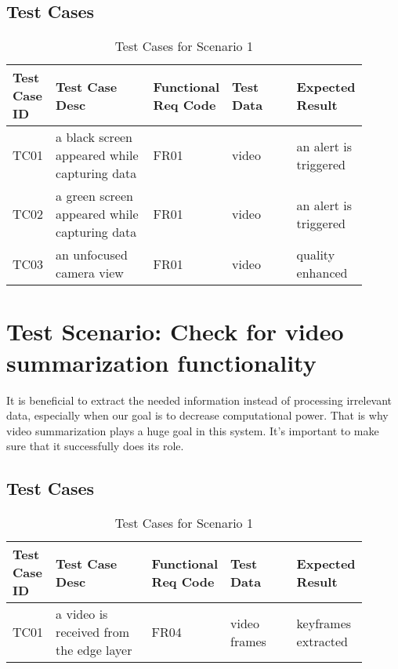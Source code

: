 \documentclass[12pt]{article}
\begin{document}
\subsection{Test Cases}
\begin{table}[h]
\caption{Test Cases for Scenario 1}
\label{tab:TC1}
\begin{tabular}{|p{0.1\linewidth}|p{0.3\linewidth}|p{0.1\linewidth}|p{0.2\linewidth}|p{0.2\linewidth}|}
\hline
Test Case ID & Test Case Desc & Functional Req Code & Test Data & Expected Result \\ \hline
TC01  & a black screen appeared while capturing data & FR01 &  video   &  an alert is triggered                \\ \hline
TC02 & a green screen appeared while capturing data   & FR01    &  video      &  an alert is triggered           \\ \hline
TC03 & an unfocused camera view  & FR01    &  video      &  quality enhanced          \\ \hline

\end{tabular}
\end{table}


\section{Test Scenario: Check for video summarization functionality}\label{sec:TSy}
It is beneficial to extract the needed information instead of processing irrelevant data, especially when our goal is to decrease computational power. That is why video summarization plays a huge goal in this system. It's important to make sure that it successfully does its role.
\subsection{Test Cases}
\begin{table}[h]
\caption{Test Cases for Scenario 1}
\label{tab:TC1}
\begin{tabular}{|p{0.1\linewidth}|p{0.3\linewidth}|p{0.1\linewidth}|p{0.2\linewidth}|p{0.2\linewidth}|}
\hline
Test Case ID & Test Case Desc & Functional Req Code & Test Data & Expected Result \\ \hline
TC01  & a video is received from the edge layer & FR04 &  video frames   &  keyframes extracted                \\ \hline

\end{tabular}
\end{table}
\end{document}
